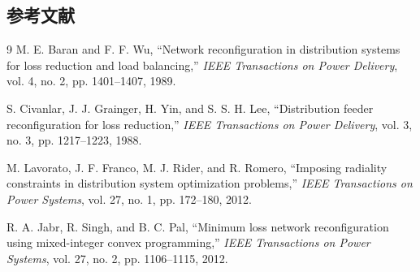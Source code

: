 \subsection{参考文献}

\begin{thebibliography}{9}\small
{}
M. E. Baran and F. F. Wu,
``Network reconfiguration in distribution systems for loss reduction and load balancing,''
\emph{IEEE Transactions on Power Delivery}, vol. 4, no. 2, pp. 1401--1407, 1989.

S. Civanlar, J. J. Grainger, H. Yin, and S. S. H. Lee,
``Distribution feeder reconfiguration for loss reduction,''
\emph{IEEE Transactions on Power Delivery}, vol. 3, no. 3, pp. 1217--1223, 1988.

M. Lavorato, J. F. Franco, M. J. Rider, and R. Romero,
``Imposing radiality constraints in distribution system optimization problems,''
\emph{IEEE Transactions on Power Systems}, vol. 27, no. 1, pp. 172--180, 2012.

R. A. Jabr, R. Singh, and B. C. Pal,
``Minimum loss network reconfiguration using mixed-integer convex programming,''
\emph{IEEE Transactions on Power Systems}, vol. 27, no. 2, pp. 1106--1115, 2012.
\end{thebibliography}
